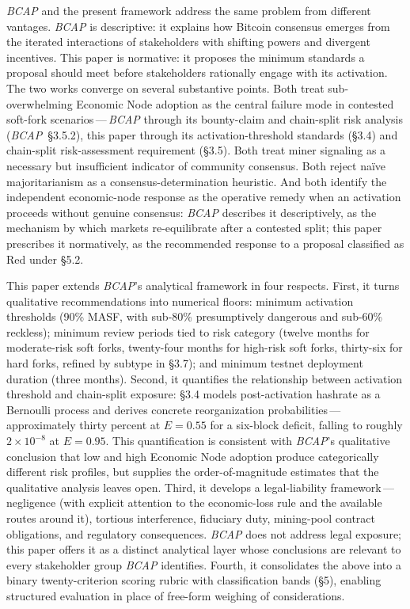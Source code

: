\documentclass[11pt, twoside, openright]{book}
\newcommand{\sect}[1]{\S#1}
\begin{document}
\textit{BCAP} and the present framework address the same problem from different vantages. \textit{BCAP} is descriptive: it explains how Bitcoin consensus emerges from the iterated interactions of stakeholders with shifting powers and divergent incentives. This paper is normative: it proposes the minimum standards a proposal should meet before stakeholders rationally engage with its activation. The two works converge on several substantive points. Both treat sub-overwhelming Economic Node adoption as the central failure mode in contested soft-fork scenarios\,---\,\textit{BCAP} through its bounty-claim and chain-split risk analysis (\textit{BCAP}~\sect{3.5.2}), this paper through its activation-threshold standards (\sect{3.4}) and chain-split risk-assessment requirement (\sect{3.5}). Both treat miner signaling as a necessary but insufficient indicator of community consensus. Both reject na\"ive majoritarianism as a consensus-determination heuristic. And both identify the independent economic-node response as the operative remedy when an activation proceeds without genuine consensus: \textit{BCAP} describes it descriptively, as the mechanism by which markets re-equilibrate after a contested split; this paper prescribes it normatively, as the recommended response to a proposal classified as Red under \sect{5.2}.

This paper extends \textit{BCAP}'s analytical framework in four respects. First, it turns qualitative recommendations into numerical floors: minimum activation thresholds (90\% MASF, with sub-80\% presumptively dangerous and sub-60\% reckless); minimum review periods tied to risk category (twelve months for moderate-risk soft forks, twenty-four months for high-risk soft forks, thirty-six for hard forks, refined by subtype in \sect{3.7}); and minimum testnet deployment duration (three months). Second, it quantifies the relationship between activation threshold and chain-split exposure: \sect{3.4} models post-activation hashrate as a Bernoulli process and derives concrete reorganization probabilities\,---\,approximately thirty percent at $E = 0.55$ for a six-block deficit, falling to roughly $2\times 10^{-8}$ at $E = 0.95$. This quantification is consistent with \textit{BCAP}'s qualitative conclusion that low and high Economic Node adoption produce categorically different risk profiles, but supplies the order-of-magnitude estimates that the qualitative analysis leaves open. Third, it develops a legal-liability framework\,---\,negligence (with explicit attention to the economic-loss rule and the available routes around it), tortious interference, fiduciary duty, mining-pool contract obligations, and regulatory consequences. \textit{BCAP} does not address legal exposure; this paper offers it as a distinct analytical layer whose conclusions are relevant to every stakeholder group \textit{BCAP} identifies. Fourth, it consolidates the above into a binary twenty-criterion scoring rubric with classification bands (\sect{5}), enabling structured evaluation in place of free-form weighing of considerations.
\end{document}
